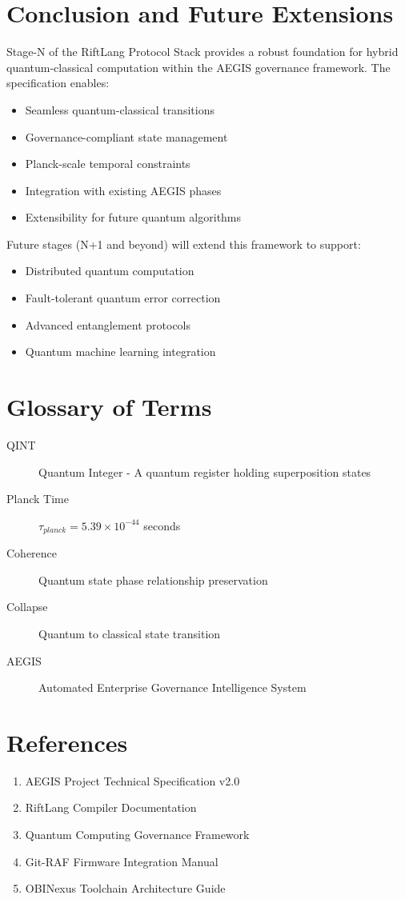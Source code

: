 \documentclass[12pt,a4paper]{article}
\begin{document}
\section{Conclusion and Future Extensions}

Stage-N of the RiftLang Protocol Stack provides a robust foundation for hybrid quantum-classical computation within the AEGIS governance framework. The specification enables:

\begin{itemize}
    \item Seamless quantum-classical transitions
    \item Governance-compliant state management
    \item Planck-scale temporal constraints
    \item Integration with existing AEGIS phases
    \item Extensibility for future quantum algorithms
\end{itemize}

Future stages (N+1 and beyond) will extend this framework to support:
\begin{itemize}
    \item Distributed quantum computation
    \item Fault-tolerant quantum error correction
    \item Advanced entanglement protocols
    \item Quantum machine learning integration
\end{itemize}

\appendix

\section{Glossary of Terms}

\begin{description}
    \item[QINT] Quantum Integer - A quantum register holding superposition states
    \item[Planck Time] $\tau_{planck} = 5.39 \times 10^{-44}$ seconds
    \item[Coherence] Quantum state phase relationship preservation
    \item[Collapse] Quantum to classical state transition
    \item[AEGIS] Automated Enterprise Governance Intelligence System
\end{description}

\section{References}

\begin{enumerate}
    \item AEGIS Project Technical Specification v2.0
    \item RiftLang Compiler Documentation
    \item Quantum Computing Governance Framework
    \item Git-RAF Firmware Integration Manual
    \item OBINexus Toolchain Architecture Guide
\end{enumerate}
\end{document}
